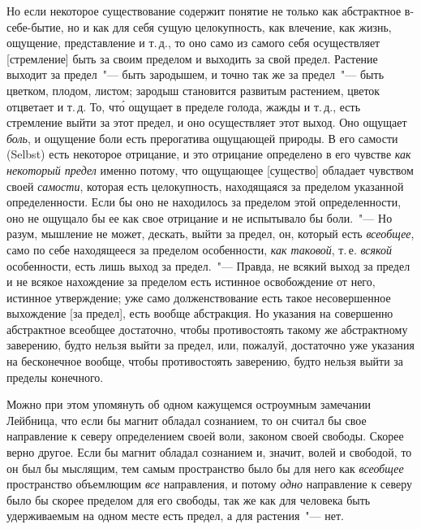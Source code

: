 Но если некоторое существование содержит понятие
не только как абстрактное в-себе-бытие, но и как для себя
сущую целокупность, как влечение, как жизнь, ощущение,
представление и т.\,д., то оно само из самого себя осуществляет
[стремление] быть за своим пределом и выходить
за свой предел. Растение выходит за предел~"--- быть
зародышем, и точно так же за предел~"--- быть цветком, плодом,
листом; зародыш становится развитым растением,
цветок отцветает и т.\,д. То, чт\'о ощущает в пределе голода,
жажды и т.\,д., есть стремление выйти за этот предел,
и оно осуществляет этот выход. Оно ощущает \emph{боль}, и
ощущение боли есть прерогатива ощущающей природы.
В его самости (Selbst) есть некоторое отрицание, и это
отрицание определено в его чувстве \emph{как некоторый предел}
именно потому, что ощущающее [существо] обладает
чувством своей \emph{самости}, которая есть целокупность, находящаяся
за пределом указанной определенности. Если бы
оно не находилось за пределом этой определенности, оно
не ощущало бы ее как свое отрицание и не испытывало
бы боли.~"--- Но разум, мышление не может, дескать, выйти
за предел, он, который есть \emph{всеобщее}, само по себе находящееся
за пределом особенности, \emph{как таковой}, т.\,е.
\emph{всякой} особенности, есть лишь выход за предел.~"--- Правда,
не всякий выход за предел и не всякое нахождение за
пределом есть истинное освобождение от него, истинное
утверждение; уже само долженствование есть такое несовершенное
выхождение [за предел], есть вообще абстракция.
Но указания на совершенно абстрактное всеобщее
достаточно, чтобы противостоять такому же абстрактному
заверению, будто нельзя выйти за предел, или, пожалуй,
достаточно уже указания на бесконечное вообще,
чтобы противостоять заверению, будто нельзя выйти за
пределы конечного.

Можно при этом упомянуть об одном кажущемся остроумным
замечании Лейбница, что если бы магнит обладал
сознанием, то он считал бы свое направление к северу
определением своей воли, законом своей свободы\endnotemark{}. Скорее
верно другое. Если бы магнит обладал сознанием и, значит,
волей и свободой, то он был бы мыслящим, тем самым
пространство было бы для него как \emph{всеобщее} пространство
объемлющим \emph{все} направления, и потому \emph{одно}
направление к северу было бы скорее пределом для его
свободы, так же как для человека быть удерживаемым
на одном месте есть предел, а для растения~"--- нет.


